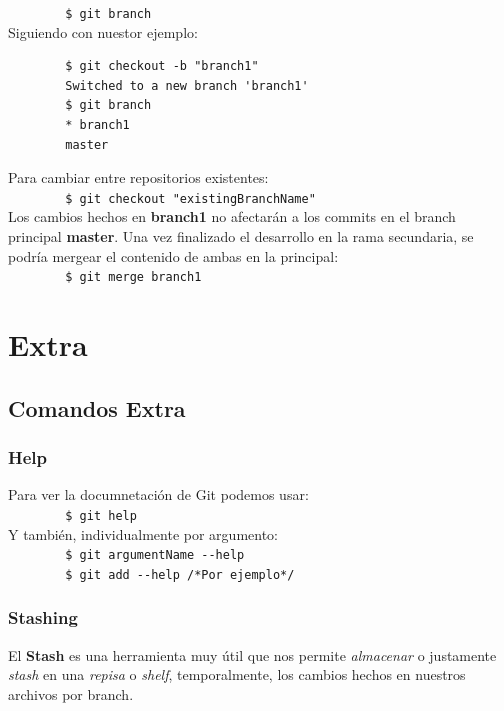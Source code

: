 \documentclass[a4paper, 12pt]{article}
\begin{document}
\verb+        $ git branch+\\

Siguiendo con nuestor ejemplo:

\begin{verbatim}
        $ git checkout -b "branch1"
        Switched to a new branch 'branch1'
        $ git branch
        * branch1
        master
\end{verbatim}

Para cambiar entre repositorios existentes:\\

\verb+        $ git checkout "existingBranchName"+\\

Los cambios hechos en \textbf{branch1} no afectarán a los commits en el branch principal \textbf{master}. Una vez finalizado el desarrollo en la rama secundaria, se podría mergear el contenido de ambas en la principal:\\

\verb+        $ git merge branch1+

\section{Extra}

\subsection{Comandos Extra}

\subsubsection{Help}

Para ver la documnetación de Git podemos usar:\\

\verb+        $ git help+\\

Y también, individualmente por argumento:\\

\verb+        $ git argumentName --help+\\
\verb+        $ git add --help /*Por ejemplo*/+\\

\subsubsection{Stashing}

El \textbf{Stash} es una herramienta muy útil que nos permite \textit{almacenar} o justamente \textit{stash} en una \textit{repisa} o \textit{shelf}, temporalmente, los cambios hechos en nuestros archivos por branch.\\
\end{document}

